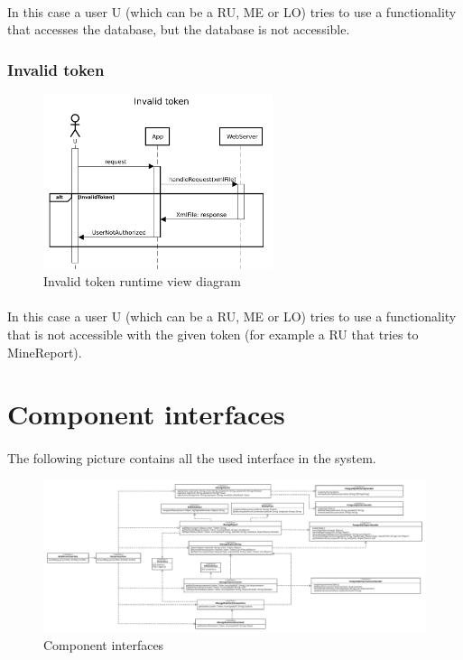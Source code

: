 					\paragraph{}
						In this case a user U (which can be a RU, ME or LO) tries to use a functionality that accesses the database, but the database is not accessible.
				\clearpage
				\subsubsection{Invalid token}
					\begin{figure}[!h]
						\centering
						\includegraphics[width=0.6\textwidth]{images/DD2/RuntimeView/Error/invalidToken.pdf}
						\caption{Invalid token runtime view diagram}
					\end{figure}
					\paragraph{}
						In this case a user U (which can be a RU, ME or LO) tries to use a functionality that is not accessible with the given token (for example a RU that tries to MineReport).
		\section{Component interfaces}
			\paragraph{}
				The following picture contains all the used interface in the system.
				\begin{figure}[!h]
					\centering
					\includegraphics[width=\textwidth]{images/DD2/interfaces.pdf}
					\caption{Component interfaces}
				\end{figure}
